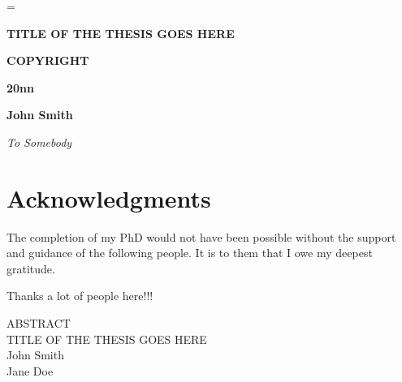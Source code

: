 \documentclass[12pt]{report}
\newcommand{\doublespaced}{\renewcommand{\baselinestretch}{1.5}\normalfont}
\numberwithin{equation}{chapter}
\def\thetitle{TITLE OF THE THESIS GOES HERE}
\def\theauthor{John Smith}
\def\theadvisor{Jane Doe}
\begin{document}
\vspace*{\fill}

\normalsize\parskip=\oldparskip


\newpage
\doublespaced

\thispagestyle{empty}

\vspace*{150pt}

\begin{center}
\begin{minipage}[b]{0.75\textwidth}
\begin{center}
\textbf{TITLE OF THE THESIS GOES HERE}

\vspace*{10pt}

\textbf{COPYRIGHT}

\vspace*{10pt}

\textbf{20nn}

\vspace*{10pt}

\textbf{John Smith}
\end{center}
\end{minipage}
\end{center}


\newpage
\vspace*{150pt}
\begin{Large}
\begin{center}
\textit{To Somebody}
\end{center}
\end{Large}

\newpage
\chapter*{Acknowledgments}


The completion of my PhD would not have been possible without the support and guidance of the following people. It is to them that I owe my deepest gratitude.

Thanks a lot of people here!!!

\newpage
\begin{center}
ABSTRACT\\
\vspace{0.25in}
\thetitle\\
\vspace{0.25in}
\theauthor\\
\theadvisor \\
\vspace{0.25in}
\end{center}
\end{document}
